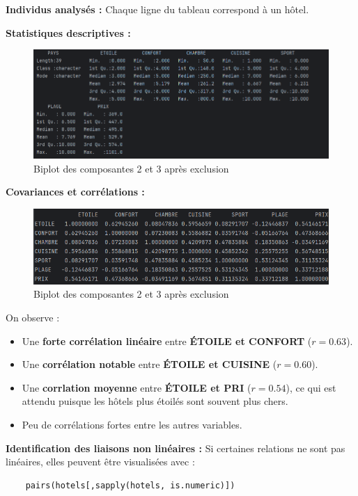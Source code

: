 \documentclass{article}
\begin{document}
    \textbf{Individus analysés :} Chaque ligne du tableau correspond à un hôtel.

    \textbf{Statistiques descriptives :}

    \begin{figure}[H]
        \centering
        \includegraphics[width=0.6\linewidth]{img/summaryhotel}
        \caption{Biplot des composantes 2 et 3 après exclusion}
    \end{figure}

    \textbf{Covariances et corrélations :}

    \begin{figure}[H]
        \centering
        \includegraphics[width=0.6\linewidth]{img/covhotel}
        \caption{Biplot des composantes 2 et 3 après exclusion}
    \end{figure}

    On observe :
    \begin{itemize}
        \item Une \textbf{forte corrélation linéaire} entre \textbf{ÉTOILE et CONFORT} ($r = 0.63$).
        \item Une \textbf{corrélation notable} entre \textbf{ÉTOILE et CUISINE} ($r = 0.60$).
        \item Une \textbf{corrlation moyenne} entre \textbf{ÉTOILE et PRI} ($r = 0.54$), ce qui est attendu puisque les hôtels plus étoilés sont souvent plus chers.
        \item Peu de corrélations fortes entre les autres variables.
    \end{itemize}

    \textbf{Identification des liaisons non linéaires :}
    Si certaines relations ne sont pas linéaires, elles peuvent être visualisées avec :

    \begin{verbatim}
    pairs(hotels[,sapply(hotels, is.numeric)])
    \end{verbatim}
\end{document}
